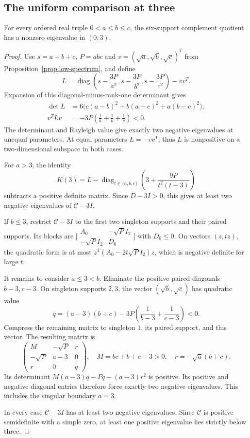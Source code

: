 \subsection{The uniform comparison at three}

\begin{theorem}
\label{thm:uniform-low-root}
For every ordered real triple $0<a\leq b\leq c$, the six-support
complement quotient has a nonzero eigenvalue in $(0,3)$.
\end{theorem}

\begin{proof}
Use $s=a+b+c$, $P=abc$ and $v=(\sqrt a,\sqrt b,\sqrt c)^T$ from
Proposition~\ref{prop:low-spectrum}, and define
\[
L=\operatorname{diag}\left(s-\frac{3P}{a^2},
s-\frac{3P}{b^2},s-\frac{3P}{c^2}\right)-vv^T.
\]
Expansion of this diagonal-minus-rank-one determinant gives
\begin{align*}
\det L&=6\bigl(c(a-b)^2+b(a-c)^2+a(b-c)^2\bigr),\\
v^TLv&=-3P\left(\frac1a+\frac1b+\frac1c\right)<0.
\end{align*}
The determinant and Rayleigh value give exactly two negative eigenvalues
at unequal parameters. At equal parameters $L=-vv^T$; thus $L$ is
nonpositive on a two-dimensional subspace in both cases.

For $a>3$, the identity
\[
K(3)=L-\operatorname{diag}_{t\in\{a,b,c\}}
\left(3+\frac{9P}{t^2(t-3)}\right)
\]
subtracts a positive definite matrix. Since $D-3I>0$, this gives
at least two negative eigenvalues of $\mathcal C-3I$.

If $b\leq3$, restrict $\mathcal C-3I$ to the first two singleton
supports and their paired supports. Its blocks are
$\bigl[\begin{smallmatrix}A_0&-\sqrt P I_2\\-\sqrt P I_2&D_0\end{smallmatrix}\bigr]$
with $D_0\leq0$. On vectors $(z,tz)$, the quadratic form is at most
$z^T(A_0-2t\sqrt P I_2)z$, which is negative definite for large $t$.

It remains to consider $a\leq3<b$. Eliminate the positive paired
diagonals $b-3,c-3$. On singleton supports $2,3$, the vector
$(\sqrt b,\sqrt c)$ has quadratic value
\[
 q=(a-3)(b+c)-3P\left(\frac1{b-3}+\frac1{c-3}\right)<0.
\]
Compress the remaining matrix to singleton $1$, its paired support,
and this vector. The resulting matrix is
\[
 \begin{pmatrix}M&-\sqrt P&r\\-\sqrt P&a-3&0\\r&0&q\end{pmatrix},
 \quad M=bc+b+c-3>0,\quad r=-\sqrt a(b+c).
\]
Its determinant $M(a-3)q-Pq-(a-3)r^2$ is positive.
Its positive and negative diagonal entries therefore force exactly
two negative eigenvalues. This includes the singular boundary $a=3$.

In every case $\mathcal C-3I$ has at least two negative eigenvalues.
Since $\mathcal C$ is positive semidefinite with a simple zero,
at least one positive eigenvalue lies strictly below three.
\end{proof}

